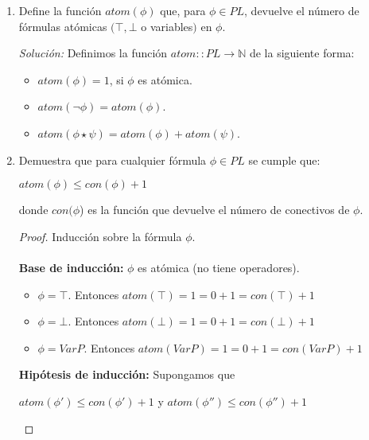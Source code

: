 \documentclass[letterpaper,12pt]{article}
\begin{document}
\begin{enumerate}
    \newpage
    \item Define la función $atom(\phi)$ que, para $\phi \in PL$, devuelve el 
    número de fórmulas atómicas $(\top, \bot$ o variables$)$ en $\phi$.
    
    \textit{Solución:} Definimos la función $atom :: PL \rightarrow \mathbb{N}$
    de la siguiente forma:
    \begin{itemize}
        \item $atom(\phi) = 1$, si $\phi$ es atómica.
        \item $atom(\neg \phi) = atom(\phi)$. 
        \item $atom(\phi \star \psi) = atom(\phi) + atom(\psi)$.
    \end{itemize}

    \item Demuestra que para cualquier fórmula $\phi \in PL$ se cumple que:
    \begin{center}
        $atom(\phi) \leq con(\phi) + 1$
    \end{center}
    donde $con(\phi$) es la función que devuelve el número de conectivos de 
    $\phi$.

    \begin{proof}
        Inducción sobre la fórmula $\phi$. \\ \\
        \textbf{Base de inducción:} $\phi$ es atómica (no tiene operadores). 
        \begin{itemize}
            \item $\phi = \top$. Entonces 
            $atom(\top)= 1 = 0 + 1 = con(\top) + 1$
            \item $\phi = \bot$. Entonces 
            $atom(\bot)= 1 = 0 + 1 = con(\bot) + 1$
            \item $\phi = Var P$. Entonces 
            $atom(Var P) = 1 = 0 + 1 = con(Var P) + 1$
        \end{itemize}

        \textbf{Hipótesis de inducción:} Supongamos que 
        \begin{center}
            $atom(\phi') \leq con(\phi') + 1$ y $atom(\phi'') \leq con(\phi'') + 1$
        \end{center}


\end{proof}
\end{enumerate}
\end{document}
